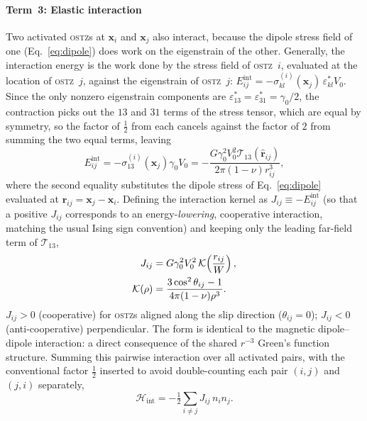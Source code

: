 \documentclass[3p]{elsarticle}
\newcommand{\OSTZ}{\textsc{ostz}}
\newcommand{\gz}{\gamma_0}
\newcommand{\half}{\tfrac{1}{2}}
\begin{document}
\paragraph{Term~3: Elastic interaction}
Two activated \OSTZ s at $\mathbf x_i$ and $\mathbf x_j$ also
interact, because the dipole stress field of one (Eq.~\eqref{eq:dipole})
does work on the eigenstrain of the other. Generally, the interaction
energy is the work done by the stress field of \OSTZ\ $i$, evaluated
at the location of \OSTZ\ $j$, against the eigenstrain of \OSTZ\ $j$:
$E_{ij}^\text{int}=-\sigma_{kl}^{(i)}(\mathbf x_j)\,\varepsilon^*_{kl}V_0$.
Since the only nonzero eigenstrain components are
$\varepsilon^*_{13}=\varepsilon^*_{31}=\gz/2$, the contraction picks
out the $13$ and $31$ terms of the stress tensor, which are equal by
symmetry, so the factor of $\half$ from each cancels against the
factor of $2$ from summing the two equal terms, leaving
\begin{equation}
  E_{ij}^\text{int}=-\sigma_{13}^{(i)}(\mathbf x_j)\gz V_0
  =-\frac{G\gz^2V_0^2\mathcal T_{13}(\hat{\mathbf r}_{ij})}
  {2\pi(1-\nu)r_{ij}^3},
  \label{eq:Eint}
\end{equation}
where the second equality substitutes the dipole stress of
Eq.~\eqref{eq:dipole} evaluated at $\mathbf r_{ij}=\mathbf
x_j-\mathbf x_i$. Defining the interaction kernel as
$J_{ij}\equiv-E_{ij}^\text{int}$ (so that a positive $J_{ij}$
corresponds to an energy-\emph{lowering}, cooperative interaction,
matching the usual Ising sign convention) and keeping only the
leading far-field term of $\mathcal T_{13}$,
\begin{align}
  J_{ij}&=G\gz^2V_0^2\,\mathcal K\!\left(\frac{r_{ij}}{W}\right),
    \label{eq:Jij}\\
  \mathcal K(\rho)&=\frac{3\cos^2\theta_{ij}-1}{4\pi(1-\nu)\rho^3}.
    \notag
\end{align}
$J_{ij}>0$ (cooperative) for \OSTZ s aligned along the slip direction
($\theta_{ij}=0$); $J_{ij}<0$ (anti-cooperative) perpendicular.
The form is identical to the magnetic dipole--dipole interaction: a
direct consequence of the shared $r^{-3}$ Green's function structure.
Summing this pairwise interaction over all activated pairs, with the
conventional factor $\half$ inserted to avoid double-counting each
pair $(i,j)$ and $(j,i)$ separately,
\begin{equation}
  \mathcal H_\text{int}=-\half\sum_{i\ne j}J_{ij}\,n_in_j.
  \label{eq:Hint}
\end{equation}
\end{document}
